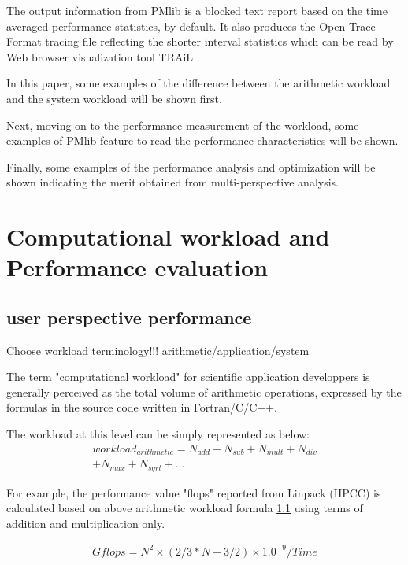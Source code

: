 \documentclass[conference]{IEEEtran}
\begin{document}
The output information from PMlib is a blocked text report based on
the time averaged performance statistics, by default.
It also produces the Open Trace Format \cite{} tracing file reflecting
the shorter interval statistics which can be read by Web browser
visualization tool TRAiL \cite{}.

In this paper, some examples of the difference between
the arithmetic workload and the system workload will be shown first.

Next, moving on to the performance measurement of the workload,
some examples of PMlib feature to read the performance characteristics
will be shown.

Finally, some examples of the performance analysis and optimization
will be shown indicating the merit obtained from 
multi-perspective analysis.



\section{Computational workload and Performance evaluation}
\subsection{user perspective performance}

{\color{blue} Choose workload terminology!!! arithmetic/application/system}

The term "computational workload" for scientific application developpers
is generally perceived as the total volume of arithmetic operations,
expressed by the formulas in the source code written in Fortran/C/C++.

The workload at this level can be simply represented as below:
\begin{align*}
workload_{arithmetic} = N_{add} + N_{sub} + N_{mult} + N_{div} \\
	+ N_{max} + N_{sqrt} + ...
\end{align*}


For example, the performance value "flops" reported from Linpack (HPCC)
\cite{}
is calculated based on above arithmetic workload formula
\ref{}
using terms of addition and multiplication only.

\begin{align*}
Gflops = N^{2} \times ( 2/3 * N + 3/2 ) \times 1.0^{-9} / Time 
\end{align*}
\end{document}

